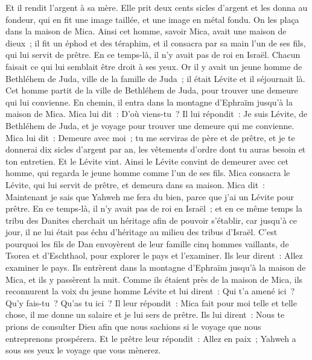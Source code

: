 \begin{multicols}{2}
Et il rendit l'argent à sa mère. Elle prit deux cents sicles d'argent et les donna au fondeur, qui en fit une image taillée, et une image en métal fondu. On les plaça dans la maison de Mica.
Ainsi cet homme, savoir Mica, avait une maison de dieux~; il fit un éphod et des téraphim, et il consacra par sa main l'un de ses fils, qui lui servit de prêtre.
En ce temps-là, il n'y avait pas de roi en Israël. Chacun faisait ce qui lui semblait être droit à ses yeux.
Or il y avait un jeune homme de Bethléhem de Juda, ville de la famille de Juda~; il était Lévite et il séjournait là.
Cet homme partit de la ville de Bethléhem de Juda, pour trouver une demeure qui lui convienne. En chemin, il entra dans la montagne d'Ephraïm jusqu'à la maison de Mica.
Mica lui dit~: D'où viens-tu~? Il lui répondit~: Je suis Lévite, de Bethléhem de Juda, et je voyage pour trouver une demeure qui me convienne.
Mica lui dit~: Demeure avec moi~; tu me serviras de père et de prêtre, et je te donnerai dix sicles d'argent par an, les vêtements d'ordre dont tu auras besoin et ton entretien. Et le Lévite vint.
Ainsi le Lévite convint de demeurer avec cet homme, qui regarda le jeune homme comme l'un de ses fils.
Mica consacra le Lévite, qui lui servit de prêtre, et demeura dans sa maison.
Mica dit~: Maintenant je sais que Yahweh me fera du bien, parce que j'ai un Lévite pour prêtre.
\VerseOne{}En ce temps-là, il n'y avait pas de roi en Israël~; et en ce même temps la tribu des Danites cherchait un héritage afin de pouvoir s'établir, car jusqu'à ce jour, il ne lui était pas échu d'héritage au milieu des tribus d'Israël.
C'est pourquoi les fils de Dan envoyèrent de leur famille cinq hommes vaillants, de Tsorea et d'Eschthaol, pour explorer le pays et l'examiner. Ils leur dirent~: Allez examiner le pays. Ils entrèrent dans la montagne d'Ephraïm jusqu'à la maison de Mica, et ils y passèrent la nuit.
Comme ils étaient près de la maison de Mica, ils reconnurent la voix du jeune homme Lévite et lui dirent~: Qui t'a amené ici~? Qu'y fais-tu~? Qu'as tu ici~?
Il leur répondit~: Mica fait pour moi telle et telle chose, il me donne un salaire et je lui sers de prêtre.
Ils lui dirent~: Nous te prions de consulter Dieu afin que nous sachions si le voyage que nous entreprenons prospérera.
Et le prêtre leur répondit~: Allez en paix~; Yahweh a sous ses yeux le voyage que vous mènerez.

\end{multicols}
